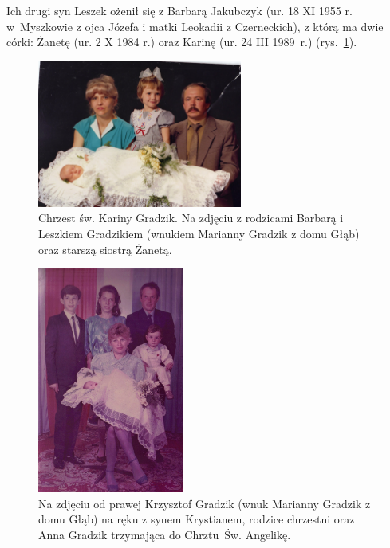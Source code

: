 Ich drugi syn Leszek ożenił się z Barbarą Jakubczyk (ur. 18 XI 1955 r. w~Myszkowie z ojca Józefa i matki Leokadii z Czerneckich), z którą ma dwie córki: Żanetę (ur. 2 X 1984 r.) oraz Karinę (ur. 24 III 1989~r.) (rys.~\ref{rys:leszek_barbara_karina_zaneta_gradzik}).

\begin{figure}[!h]
\begin{center}
\includegraphics[width=0.6\textwidth]{zdjecia/leszek_barbara_karina_zaneta_gradzik.jpg}
\caption[Chrzest św. Kariny Gradzik]{Chrzest św. Kariny Gradzik. Na zdjęciu z rodzicami Barbarą i Leszkiem Gradzikiem (wnukiem Marianny Gradzik z domu Głąb) oraz starszą siostrą Żanetą.}
\label{rys:leszek_barbara_karina_zaneta_gradzik}
\end{center}
\end{figure}

\begin{figure}[!h]
\begin{center}
\includegraphics[width=0.43\textwidth]{zdjecia/chrzest_angeliki_gradzik.jpg}
\caption[Chrzest św. Angeliki Gradzik]{Na zdjęciu od prawej Krzysztof Gradzik (wnuk Marianny Gradzik z domu Głąb) na ręku z synem Krystianem, rodzice chrzestni oraz Anna Gradzik trzymająca do Chrztu~Św. Angelikę.}
\label{rys:chrzest_angeliki_gradzik}
\end{center}
\end{figure}

